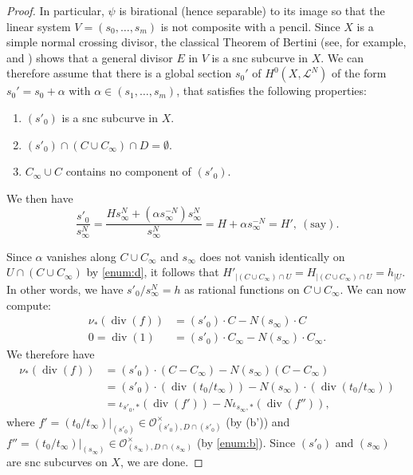 \documentclass[11pt]{article}
\numberwithin{equation}{section}
\let\mathcal\mathscr
\theoremstyle{definition}
\newcommand{\sL}{{\mathcal L}}
\newcommand{\sO}{{\mathcal O}}\let\cO\sO
\DeclareMathOperator{\divf}{div}
\begin{document}
\begin{proof}
In particular, $\psi$ is birational (hence separable) to its image so that the linear
system $V = (s_0, \ldots, s_m)$ is not composite with a pencil.
Since $X$ is a simple normal crossing divisor, the
classical Theorem of Bertini (see, for example, \cite[Th.\,I.6.3]{Zar58}
and \cite[Chap.\,6]{Jou})
shows that a general divisor $E$ in $V$ is a snc subcurve in $X$.
We can therefore assume that there is a global section $s_0'$ of
$H^0(X, \sL^{N})$ of the form $s_0' = s_0 +\alpha$ with
$\alpha \in (s_1,\ldots, s_m)$, that satisfies the following properties:\enlargethispage{.5\baselineskip}%
\begin{enumerate}\renewcommand{\theenumi}{\alph{enumi}$'$}
\item
$(s'_0)$ is a snc subcurve in $X$.
\item
$(s'_0) \cap (C \cup C_{\infty}) \cap D = \emptyset$.
\item
$C_{\infty} \cup C$ contains no component of $(s'_0)$.
\end{enumerate}

We then have\vspace*{-3pt}
\[
\frac{s'_0}{s^N_{\infty}} = \frac{Hs^N_{\infty} + (\alpha s^{-N}_{\infty})
s^N_{\infty}}{s^N_{\infty}} = H + \alpha s^{-N}_{\infty} = H', \ (\mbox{say}).
\]

Since $\alpha$ vanishes along $C \cup C_{\infty}$ and $s_{\infty}$ does not
vanish identically on $U\cap (C\cup C_\infty)$ by \eqref{enum:d}, it follows that
$H'_{|{(C \cup C_{\infty}) \cap U}} =
H_{|{(C \cup C_{\infty}) \cap U}} = h_{|U}$. In other words, we have
${s'_0}/{s^N_{\infty}} = h$ as rational functions on $C \cup C_{\infty}$.
We can now compute:\vspace*{-3pt}
\begin{align*}
\nu_*(\divf(f)) &= (s'_0) \cdot C - N (s_\infty) \cdot C\\
0 = \divf(1) &= (s'_0) \cdot C_{\infty} - N (s_\infty)\cdot C_{\infty}.
\end{align*}
We therefore have\vspace*{-3pt}
\begin{align*}
\nu_*(\divf(f)) & = (s'_0) \cdot (C - C_{\infty}) -
N(s_{\infty})(C - C_{\infty}) \\
& = (s'_0) \cdot (\divf({t_0}/{t_{\infty}})) - N(s_{\infty}) \cdot
(\divf({t_0}/{t_{\infty}})) \\
& = \iota_{{s'_0}, *}(\divf(f')) - N \iota_{{s_{\infty}}, *}(\divf(f'')),
\end{align*}
where $f' = ({t_0}/{t_{\infty}})|_{(s'_0)} \in
\sO^{\times}_{(s'_0), D \cap (s'_0)}$ (by (b')) and
$f'' = (t_0/t_{\infty})|_{(s_\infty)} \in
\sO_{(s_\infty), D\cap (s_\infty) }^{\times}$ (by \eqref{enum:b}).
Since $(s'_0)$ and $(s_\infty)$ are snc subcurves on $X$, we are done.
\end{proof}
\end{document}

